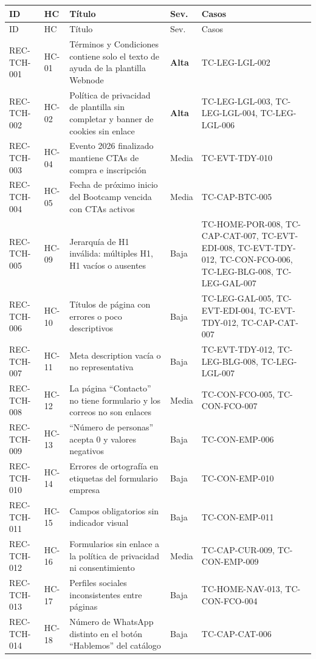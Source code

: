 \documentclass[11pt,a4paper]{article}
\begin{document}
{\footnotesize
\begin{xltabular}{\textwidth}{@{}l l X l >{\raggedright\arraybackslash}p{0.27\textwidth}@{}}
\toprule
ID & HC & Título & Sev. & Casos \\
\midrule
\endfirsthead
\toprule
ID & HC & Título & Sev. & Casos \\
\midrule
\endhead
REC-TCH-001 & HC-01 & Términos y Condiciones contiene solo el texto de ayuda de la plantilla Webnode & \textbf{Alta} & TC-LEG-LGL-002 \\
REC-TCH-002 & HC-02 & Política de privacidad de plantilla sin completar y banner de cookies sin enlace & \textbf{Alta} & TC-LEG-LGL-003, TC-LEG-LGL-004, TC-LEG-LGL-006 \\
REC-TCH-003 & HC-04 & Evento 2026 finalizado mantiene CTAs de compra e inscripción & Media & TC-EVT-TDY-010 \\
REC-TCH-004 & HC-05 & Fecha de próximo inicio del Bootcamp vencida con CTAs activos & Media & TC-CAP-BTC-005 \\
REC-TCH-005 & HC-09 & Jerarquía de H1 inválida: múltiples H1, H1 vacíos o ausentes & Baja & TC-HOME-POR-008, TC-CAP-CAT-007, TC-EVT-EDI-008, TC-EVT-TDY-012, TC-CON-FCO-006, TC-LEG-BLG-008, TC-LEG-GAL-007 \\
REC-TCH-006 & HC-10 & Títulos de página con errores o poco descriptivos & Baja & TC-LEG-GAL-005, TC-EVT-EDI-004, TC-EVT-TDY-012, TC-CAP-CAT-007 \\
REC-TCH-007 & HC-11 & Meta description vacía o no representativa & Baja & TC-EVT-TDY-012, TC-LEG-BLG-008, TC-LEG-LGL-007 \\
REC-TCH-008 & HC-12 & La página ``Contacto'' no tiene formulario y los correos no son enlaces & Media & TC-CON-FCO-005, TC-CON-FCO-007 \\
REC-TCH-009 & HC-13 & ``Número de personas'' acepta 0 y valores negativos & Baja & TC-CON-EMP-006 \\
REC-TCH-010 & HC-14 & Errores de ortografía en etiquetas del formulario empresa & Baja & TC-CON-EMP-010 \\
REC-TCH-011 & HC-15 & Campos obligatorios sin indicador visual & Baja & TC-CON-EMP-011 \\
REC-TCH-012 & HC-16 & Formularios sin enlace a la política de privacidad ni consentimiento & Media & TC-CAP-CUR-009, TC-CON-EMP-009 \\
REC-TCH-013 & HC-17 & Perfiles sociales inconsistentes entre páginas & Baja & TC-HOME-NAV-013, TC-CON-FCO-004 \\
REC-TCH-014 & HC-18 & Número de WhatsApp distinto en el botón ``Hablemos'' del catálogo & Baja & TC-CAP-CAT-006 \\

\end{xltabular}}
\end{document}

